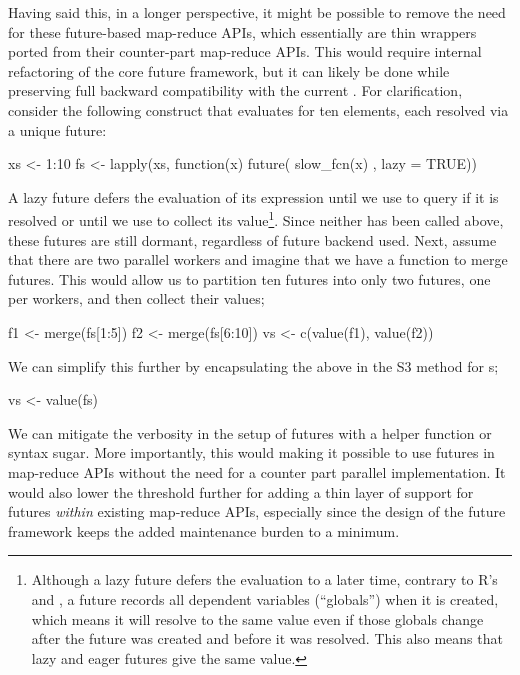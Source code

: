 Having said this, in a longer perspective, it might be possible to
remove the need for these future-based map-reduce APIs, which
essentially are thin wrappers ported from their counter-part
map-reduce APIs.  This would require internal refactoring of the core
future framework, but it can likely be done while preserving full
backward compatibility with the current .
%
For clarification, consider the following  construct
that evaluates  for ten elements, each resolved via
a unique  future:
\begin{example}
xs <- 1:10
fs <- lapply(xs, function(x) future({
  slow_fcn(x)
}, lazy = TRUE))
\end{example}
%
A lazy future defers the evaluation of its expression until we
use  to query if it is resolved or until we
use  to collect its value\footnote{Although a lazy
future defers the evaluation to a later time, contrary to
R's  and , a future records all
dependent variables (``globals'') when it is created, which means it
will resolve to the same value even if those globals change after the
future was created and before it was resolved.  This also means that
lazy and eager futures give the same value.}.  Since neither has been
called above, these futures are still dormant, regardless of future
backend used.  Next, assume that there are two parallel workers and
imagine that we have a function  to merge futures.  This
would allow us to partition ten futures into only two futures, one per
workers, and then collect their values;
\begin{example}
f1 <- merge(fs[1:5])
f2 <- merge(fs[6:10])
vs <- c(value(f1), value(f2))
\end{example}
We can simplify this further by encapsulating the above in the S3
method  for s;
\begin{example}
vs <- value(fs)
\end{example}
%
We can mitigate the verbosity in the setup of futures with a helper
function or syntax sugar.  More importantly, this would making it
possible to use futures in map-reduce APIs without the need for a
counter part parallel implementation.  It would also lower the
threshold further for adding a thin layer of support for
futures \emph{within} existing map-reduce APIs, especially since the
design of the future framework keeps the added maintenance burden to a
minimum.

